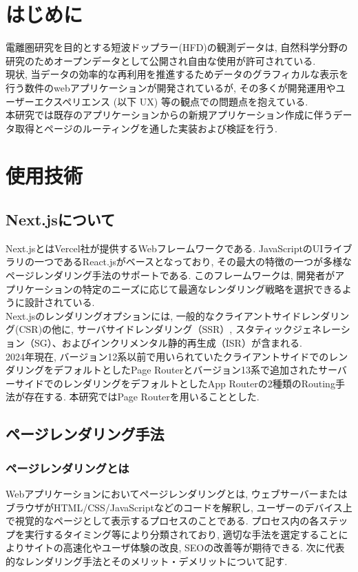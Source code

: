 \section{はじめに}
電離圏研究を目的とする短波ドップラー(HFD)の観測データは, 自然科学分野の研究のためオープンデータとして公開され自由な使用が許可されている. \\
現状, 当データの効率的な再利用を推進するためデータのグラフィカルな表示を行う数件のwebアプリケーションが開発されているが, その多くが開発運用やユーザーエクスペリエンス (以下 UX) 等の観点での問題点を抱えている. 
\\本研究では既存のアプリケーションからの新規アプリケーション作成に伴うデータ取得とページのルーティングを通した実装および検証を行う.\\

\section{使用技術}
\subsection{Next.jsについて}
Next.jsとはVercel社が提供するWebフレームワークである.
JavaScriptのUIライブラリの一つであるReact.jsがベースとなっており, その最大の特徴の一つが多様なページレンダリング手法のサポートである.
このフレームワークは, 開発者がアプリケーションの特定のニーズに応じて最適なレンダリング戦略を選択できるように設計されている. \\
Next.jsのレンダリングオプションには, 一般的なクライアントサイドレンダリング(CSR)の他に, サーバサイドレンダリング（SSR）, スタティックジェネレーション（SG）、およびインクリメンタル静的再生成（ISR）が含まれる.\\
2024年現在, バージョン12系以前で用いられていたクライアントサイドでのレンダリングをデフォルトとしたPage Routerとバージョン13系で追加されたサーバーサイドでのレンダリングをデフォルトとしたApp Routerの2種類のRouting手法が存在する.
本研究ではPage Routerを用いることとした.

\subsection{ページレンダリング手法}
\subsubsection{ページレンダリングとは}
Webアプリケーションにおいてページレンダリングとは, ウェブサーバーまたはブラウザがHTML/CSS/JavaScriptなどのコードを解釈し, ユーザーのデバイス上で視覚的なページとして表示するプロセスのことである.
プロセス内の各ステップを実行するタイミング等により分類されており, 適切な手法を選定することによりサイトの高速化やユーザ体験の改良, SEOの改善等が期待できる.
次に代表的なレンダリング手法とそのメリット・デメリットについて記す.

